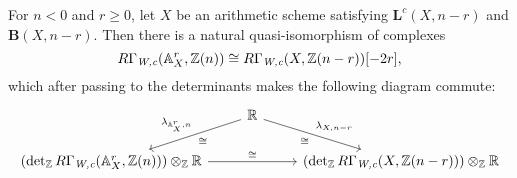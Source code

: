 \documentclass{article}
\numberwithin{equation}{section}
\begin{document}
\begin{lemma}
  \label{lemma:lambda-and-affine-bundles}
  For $n < 0$ and $r \ge 0$, let $X$ be an arithmetic scheme satisfying
  $\mathbf{L}^c (X,n-r)$ and $\mathbf{B} (X,n-r)$. Then there is a natural
  quasi-isomorphism of complexes
  \begin{equation}
    \label{eqn:RGamma-Wc-and-affine-bundles}
    R\Gamma_{\text{\it W,c}} (\mathbb{A}^r_X, \mathbb{Z} (n)) \cong R\Gamma_{\text{\it W,c}} (X, \mathbb{Z} (n-r)) [-2r],
  \end{equation}
  which after passing to the determinants makes the following diagram commute:
  \begin{equation}
    \label{eqn:lambda-and-affine-bundles}
    \begin{tikzcd}
    & \RR\ar{dl}{\cong}[swap]{\lambda_{\AA^r_X,n}}\ar{dr}{\lambda_{X,n-r}}[swap]{\cong} \\
      (\det_\ZZ R\Gamma_\Wc (\AA^r_X, \ZZ (n)))\otimes_\ZZ \RR \ar{rr}{\cong} & & (\det_\ZZ R\Gamma_\Wc (X, \ZZ (n-r)))\otimes_\ZZ \RR
    \end{tikzcd}
  \end{equation}


\end{lemma}
\end{document}
